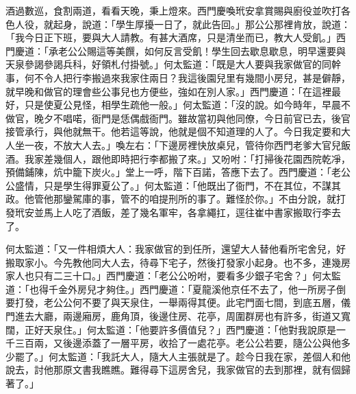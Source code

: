 酒過數巡，食割兩道，看看天晚，秉上燈來。西門慶喚玳安拿賞賜與廚役並吹打各色人役，就起身，說道：「學生厚擾一日了，就此告回。」那公公那裡肯放，說道：「我今日正下班，要與大人請教。有甚大酒席，只是清坐而已，教大人受飢。」西門慶道：「承老公公賜這等美饌，如何反言受飢！學生回去歇息歇息，明早還要與天泉參謁參謁兵科，好領札付掛號。」何太監道：「既是大人要與我家做官的同幹事，何不令人把行李搬過來我家住兩日？我這後園兒里有幾間小房兒，甚是僻靜，就早晚和做官的理會些公事兒也方便些，強如在別人家。」西門慶道：「在這裡最好，只是使夏公見怪，相學生疏他一般。」何太監道：「沒的說。如今時年，早晨不做官，晚夕不唱喏，衙門是恁偶戲衙門。雖故當初與他同僚，今日前官已去，後官接管承行，與他就無干。他若這等說，他就是個不知道理的人了。今日我定要和大人坐一夜，不放大人去。」喚左右：「下邊房裡快放桌兒，管待你西門老爹大官兒飯酒。我家差幾個人，跟他即時把行李都搬了來。」又吩咐：「打掃後花園西院乾凈，預備鋪陳，炕中籠下炭火。」堂上一呼，階下百諾，答應下去了。西門慶道：「老公公盛情，只是學生得罪夏公了。」何太監道：「他既出了衙門，不在其位，不謀其政。他管他那鑾駕庫的事，管不的咱提刑所的事了。難怪於你。」不由分說，就打發玳安並馬上人吃了酒飯，差了幾名軍牢，各拿繩扛，逕往崔中書家搬取行李去了。

何太監道：「又一件相煩大人：我家做官的到任所，還望大人替他看所宅舍兒，好搬取家小。今先教他同大人去，待尋下宅子，然後打發家小起身。也不多，連幾房家人也只有二三十口。」西門慶道：「老公公吩咐，要看多少銀子宅舍？」何太監道：「也得千金外房兒才夠住。」西門慶道：「夏龍溪他京任不去了，他一所房子倒要打發，老公公何不要了與天泉住，一舉兩得其便。此宅門面七間，到底五層，儀門進去大廳，兩邊廂房，鹿角頂，後邊住房、花亭，周圍群房也有許多，街道又寬闊，正好天泉住。」何太監道：「他要許多價值兒？」西門慶道：「他對我說原是一千三百兩，又後邊添蓋了一層平房，收拾了一處花亭。老公公若要，隨公公與他多少罷了。」何太監道：「我託大人，隨大人主張就是了。趁今日我在家，差個人和他說去，討他那原文書我瞧瞧。難得尋下這房舍兒，我家做官的去到那裡，就有個歸著了。」

